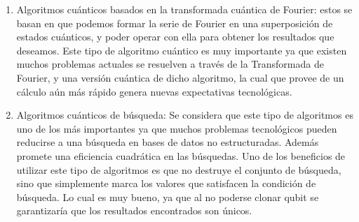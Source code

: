 \begin{enumerate}
    \item Algoritmos cuánticos basados en la transformada cuántica de Fourier: estos se basan en que podemos formar la serie de Fourier en una superposición de estados cuánticos, y poder operar con ella para obtener los resultados que deseamos. Este tipo de algoritmo cuántico es muy importante ya que existen muchos problemas actuales se resuelven a través de la Transformada de Fourier, y una versión cuántica de dicho algoritmo, la cual que provee de un cálculo aún más rápido genera nuevas expectativas tecnológicas.

    \item Algoritmos cuánticos de búsqueda: Se considera que este tipo de algoritmos es uno de los más importantes ya que muchos problemas tecnológicos pueden reducirse a una búsqueda en bases de datos no estructuradas. Además promete una eficiencia cuadrática en las búsquedas. Uno de los beneficios de utilizar este tipo de algoritmos es que no destruye el conjunto de búsqueda, sino que simplemente marca los valores que satisfacen la condición de búsqueda. Lo cual es muy bueno, ya que al no poderse clonar qubit se garantizaría que los resultados encontrados son únicos.


\end{enumerate}
